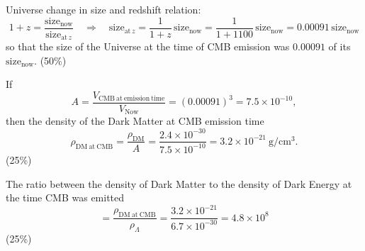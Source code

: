 Universe change in size and redshift relation:
\[
1+z = \frac{\mathrm{size}_{\mathrm{now}}}{\mathrm{size}_{\mathrm{at}\,z}}
\quad\Longrightarrow\quad
\mathrm{size}_{\mathrm{at}\,z} = \frac{1}{1+z}\,\mathrm{size}_{\mathrm{now}}
= \frac{1}{1+1100}\,\mathrm{size}_{\mathrm{now}}
= 0.00091\,\mathrm{size}_{\mathrm{now}}
\]
so that the size of the Universe at the time of CMB emission was $0.00091$ of
its $\mathrm{size}_{\mathrm{now}}$.
\hfill(50\%)

If
\[
A = \frac{V_{\mathrm{CMB\ at\ emission\ time}}}{V_{\mathrm{Now}}}
= (0.00091)^3 = 7.5\times10^{-10},
\]
then the density of the Dark Matter at CMB emission time
\[
\rho_{\mathrm{DM\ at\ CMB}} = \frac{\rho_{\mathrm{DM}}}{A}
= \frac{2.4\times10^{-30}}{7.5\times10^{-10}}
= 3.2\times10^{-21}\ \mathrm{g/cm^3}.
\]
\hfill(25\%)

The ratio between the density of Dark Matter to the density of Dark Energy at
the time CMB was emitted
\[
= \frac{\rho_{\mathrm{DM\ at\ CMB}}}{\rho_{\Lambda}}
= \frac{3.2\times10^{-21}}{6.7\times10^{-30}} = 4.8\times10^{8}
\]
\hfill(25\%)

